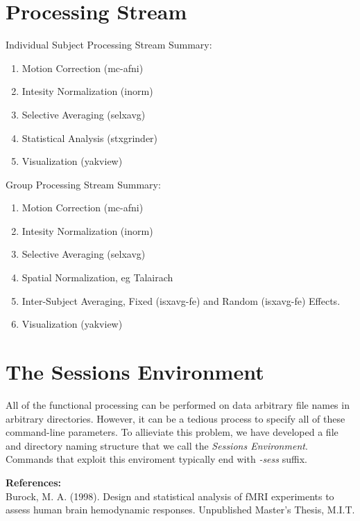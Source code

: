 \documentclass[10pt]{article}
\begin{document}
\section{Processing Stream}

Individual Subject Processing Stream Summary:\\
\begin{enumerate}
\item Motion Correction (mc-afni)
\item Intesity Normalization (inorm)
\item Selective Averaging (selxavg)
\item Statistical Analysis (stxgrinder)
\item Visualization (yakview)
\end{enumerate}

Group Processing Stream Summary:\\
\begin{enumerate}
\item Motion Correction (mc-afni)
\item Intesity Normalization (inorm)
\item Selective Averaging (selxavg)
\item Spatial Normalization, eg Talairach
\item Inter-Subject Averaging, Fixed (isxavg-fe) and Random
(isxavg-fe) Effects.
\item Visualization (yakview)
\end{enumerate}

\section{The Sessions Environment}

All of the functional processing can be performed on data arbitrary
file names in arbitrary directories.  However, it can be a tedious
process to specify all of these command-line parameters.  To
allieviate this problem, we have developed a file and directory naming
structure that we call the {\em Sessions Environment}.  Commands that
exploit this enviroment typically end with {\em -sess} suffix.


\noindent
{\bf References:}\\

\indent Burock, M. A. (1998). Design and statistical analysis of fMRI
experiments to assess human brain hemodynamic responses. Unpublished
Master's Thesis, M.I.T.\\
\end{document}
